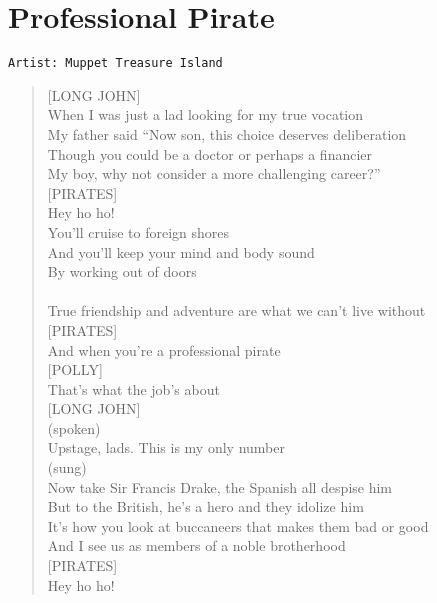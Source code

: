 \documentclass[11pt]{article}
\begin{document}
\section{Professional Pirate}
\label{sec:org42bd21a}
\begin{verbatim}
Artist: Muppet Treasure Island
\end{verbatim}
\begin{verse}
[LONG JOHN]\\
When I was just a lad looking for my true vocation\\
My father said ``Now son, this choice deserves deliberation\\
Though you could be a doctor or perhaps a financier\\
My boy, why not consider a more challenging career?''\\
\vspace*{1em}
[PIRATES]\\
Hey ho ho!\\
You'll cruise to foreign shores\\
And you'll keep your mind and body sound\\
By working out of doors\\
[LONG JOHN]\\
True friendship and adventure are what we can't live without\\
\vspace*{1em}
[PIRATES]\\
And when you're a professional pirate\\
\vspace*{1em}
[POLLY]\\
That's what the job's about\\
\vspace*{1em}
[LONG JOHN]\\
(spoken)\\
Upstage, lads. This is my only number\\
\vspace*{1em}
(sung)\\
Now take Sir Francis Drake, the Spanish all despise him\\
But to the British, he's a hero and they idolize him\\
It's how you look at buccaneers that makes them bad or good\\
And I see us as members of a noble brotherhood\\
\vspace*{1em}
[PIRATES]\\
Hey ho ho!\\

\end{verse}
\end{document}
